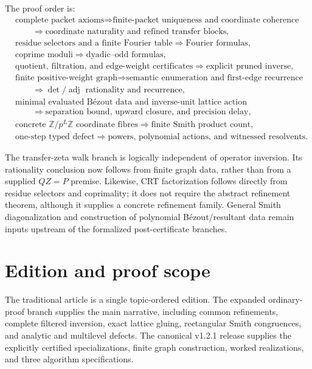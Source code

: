 \documentclass[11pt,a4paper]{article}
\theoremstyle{definition}
\theoremstyle{remark}
\theoremstyle{definition}\newtheorem{construction}[theorem]{Construction}\newtheorem{certificate}[theorem]{Numerical Certificate}
\theoremstyle{remark}\newtheorem{boundary}[theorem]{Boundary}
\begin{document}
The proof order is:
\[
\begin{aligned}
&\text{complete packet axioms}
  \Rightarrow\text{finite-packet uniqueness and coordinate coherence}\\
&\qquad\Rightarrow\text{coordinate naturality and refined transfer blocks},\\
&\text{residue selectors and a finite Fourier table}
  \Rightarrow\text{Fourier formulas},\\
&\text{coprime moduli}\Rightarrow\text{dyadic--odd formulas},\\
&\text{quotient, filtration, and edge-weight certificates}
  \Rightarrow\text{explicit pruned inverse},\\
&\text{finite positive-weight graph}
  \Rightarrow\text{semantic enumeration and first-edge recurrence}\\
&\qquad\Rightarrow\det/\operatorname{adj}\text{ rationality and recurrence},\\
&\text{minimal evaluated B\'ezout data and inverse-unit lattice action}\\
&\qquad\Rightarrow\text{separation bound, upward closure, and precision delay},\\
&\text{concrete }\mathbb Z/p^L\mathbb Z\text{ coordinate fibres}
  \Rightarrow\text{finite Smith product count},\\
&\text{one-step typed defect}
  \Rightarrow\text{powers, polynomial actions, and witnessed resolvents}.
\end{aligned}
\]

The transfer-zeta walk branch is logically independent of operator inversion. Its
rationality conclusion now follows from finite graph data, rather than from a
supplied $QZ=P$ premise. Likewise, CRT factorization follows directly from
residue selectors and coprimality; it does not require the abstract refinement
theorem, although it supplies a concrete refinement family. General Smith
diagonalization and construction of polynomial B\'ezout/resultant data remain
inputs upstream of the formalized post-certificate branches.

\section{Edition and proof scope}\label{sec:edition-scope}
The traditional article is a single topic-ordered edition.  The expanded ordinary-proof branch supplies the main narrative, including common refinements, complete filtered inversion, exact lattice gluing, rectangular Smith congruences, and analytic and multilevel defects.  The canonical v1.2.1 release supplies the explicitly certified specializations, finite graph construction, worked realizations, and three algorithm specifications.
\end{document}
